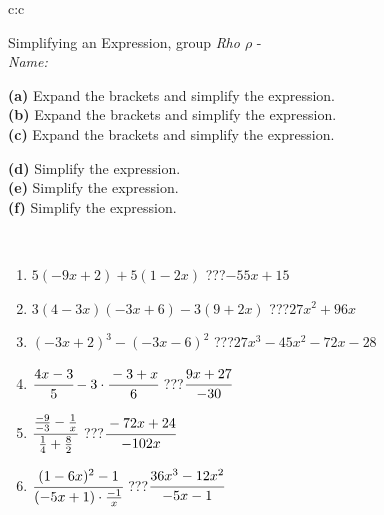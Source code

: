 \documentclass[10pt]{report}
\begin{document}
\newpage
\thispagestyle{empty}
\begin{tabular}{c:c}
\begin{minipage}[c][104.5mm][t]{0.5\linewidth}
\begin{center}
\vspace{7mm}
{\huge Simplifying an Expression, group \textit{Rho $\rho$} -}\\[5mm]
\textit{Name:}\phantom{xxxxxxxxxxxxxxxxxxxxxxxxxxxxxxxxxxxxxxxxxxxxxxxxxxxxxxxxxxxxxxxxx}\\[5mm]
\begin{minipage}{0.95\linewidth}
\begin{center}
{\small \begin{minipage}{0.6\textwidth}
\textbf{(a)} Expand the brackets and simplify the expression. \\[1mm]
\textbf{(b)} Expand the brackets and simplify the expression. \\[1mm]
\textbf{(c)} Expand the brackets and simplify the expression.
\end{minipage} \begin{minipage}{0.39\textwidth}
\textbf{(d)} Simplify the expression. \\[1mm]
\textbf{(e)} Simplify the expression. \\[1mm]
\textbf{(f)} Simplify the expression.
\end{minipage}
}
\end{center}
\end{minipage}
\\[4mm]
\begin{minipage}{0.79\linewidth}
\begin{center}
\begin{varwidth}{\linewidth}
\begin{enumerate}
\normalsize
\item $5(-9x+2)+5(1-2x)$\quad \dotfill\; ???\;\dotfill \quad $-55x+15$
\item $3(4-3x)(-3x+6)-3(9+2x)$\quad \dotfill\; ???\;\dotfill \quad $27x^2+96x$
\item $(-3x+2)^3-(-3x-6)^2$\quad \dotfill\; ???\;\dotfill \quad $27x^3-45x^2-72x-28$
\item $\cfrac{4x-3}{5}-3\cdot\cfrac{-3+x}{6}$\quad \dotfill\; ???\;\dotfill \quad $\cfrac{9x+27}{-30}$
\item $\cfrac{\frac{-9}{-3}-\frac{1}{x}}{\frac{1}{4}+\frac{8}{2}}$\quad \dotfill\; ???\;\dotfill \quad $\cfrac{-72x+24}{-102x}$
\item $\cfrac{(1-6x)^2-1}{(-5x+1)\cdot\frac{-1}{x}}$\quad \dotfill\; ???\;\dotfill \quad $\cfrac{36x^3-12x^2}{-5x-1}$

\end{enumerate}
\end{varwidth}
\end{center}
\end{minipage}
\end{center}
\end{minipage}
\end{tabular}
\end{document}
